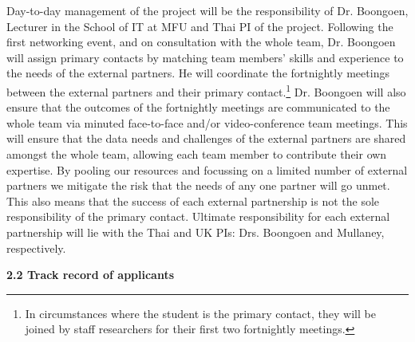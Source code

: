 \documentclass[11pt]{article}
\begin{document}
  \vspace{2mm}
  \noindent
  Day-to-day management of the project will be the responsibility of Dr. Boongoen, Lecturer in the School of IT at MFU and Thai PI of the project. Following the first networking event, and on consultation with the whole team, Dr. Boongoen will assign primary contacts by matching team members' skills and experience to the needs of the external partners. He will coordinate the fortnightly meetings between the external partners and their primary contact.\footnote{In circumstances where the student is the primary contact, they will be joined by staff researchers for their first two fortnightly meetings.} Dr. Boongoen will also ensure that the outcomes of the fortnightly meetings are communicated to the whole team via minuted face-to-face and/or video-conference team meetings. This will ensure that the data needs and challenges of the external partners are shared amongst the whole team, allowing each team member to contribute their own expertise. By pooling our resources and focussing on a limited number of external partners we mitigate the risk that the needs of any one partner will go unmet. This also means that the success of each external partnership is not the sole responsibility of the primary contact. Ultimate responsibility for each external partnership will lie with the Thai and UK PIs: Drs. Boongoen and Mullaney, respectively. 
  
  \vspace{3mm}
  \noindent
  {\large \bf 2.2 Track record of applicants}
  
\end{document}
